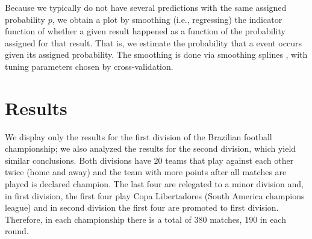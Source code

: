 \documentclass[journal,article,accept,moreauthors,pdftex,12pt,a4paper]{mdpi}
\begin{document}
Because we typically do not have several predictions with the same assigned probability $p$, we obtain a plot by smoothing (i.e., regressing) the indicator function of whether a given result happened as a function of the probability assigned for that result.
That is, we estimate the probability that a event occurs given its assigned probability.
The smoothing is done via smoothing splines \cite{wahba}, with tuning parameters chosen by cross-validation.




\section{Results}
\label{sec::results}

We display only the results for the first division of the Brazilian football championship; 
we also analyzed the results for the second division, which yield similar conclusions.
Both divisions have 20 teams that play against each other twice (home and away) and the team with more points after all matches are played is declared champion.
The last four are relegated to a minor division and, in first division, the first four play Copa Libertadores (South America champions league) and in second division the first four are promoted to first division.
Therefore, in each championship there is a total of 380 matches, 190 in each round.


\end{document}
